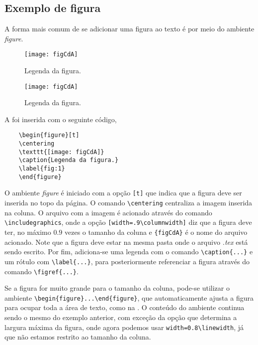 \documentclass{article}
\begin{document}
\subsection{Exemplo de figura}
A forma mais comum de se adicionar uma figura ao texto é por meio do ambiente \textit{figure}.
\begin{figure}[h]
	\centering
	\texttt{[image: figCdA]}
	\caption{Legenda da figura.}
	\label{fig:1}
\end{figure}

\begin{figure*}[t]
	\centering
	\texttt{[image: figCdA]}
	\caption{Legenda da figura.}
	\label{fig:2}
\end{figure*}

A  foi inserida com o seguinte código,
\begin{verbatim}
	\begin{figure}[t]
	\centering
	\texttt{[image: figCdA]}
	\caption{Legenda da figura.}
	\label{fig:1}
	\end{figure}
\end{verbatim}
O ambiente \textit{figure} é iniciado com a opção {\tt [t]} que indica que a figura deve ser inserida no topo da página. O comando \verb|\centering| centraliza a imagem inserida na coluna. O arquivo com a imagem é acionado através do comando \verb|\includegraphics|, onde a opção \verb|[width=.9\columnwidth]| diz que a figura deve ter, no máximo $0.9$ vezes o tamanho da coluna e \verb|{figCdA}| é o nome do arquivo acionado. Note que a figura deve estar na mesma pasta onde o arquivo \textit{.tex} está sendo escrito. Por fim, adiciona-se uma legenda com o comando \verb|\caption{...}| e um rótulo com \verb|\label{...}|, para posteriormente referenciar a figura através do comando \verb|\figref{...}|.


Se a figura for muito grande para o tamanho da coluna, pode-se utilizar o ambiente \verb|\begin{figure*}...\end{figure*}|, que automaticamente ajusta a figura para ocupar toda a área de texto, como na . O conteúdo do ambiente continua sendo o mesmo do exemplo anterior, com exceção da opção que determina a largura máxima da figura, onde agora podemos usar \verb|width=0.8\linewidth|, já que não estamos restrito ao tamanho da coluna.
\end{document}
